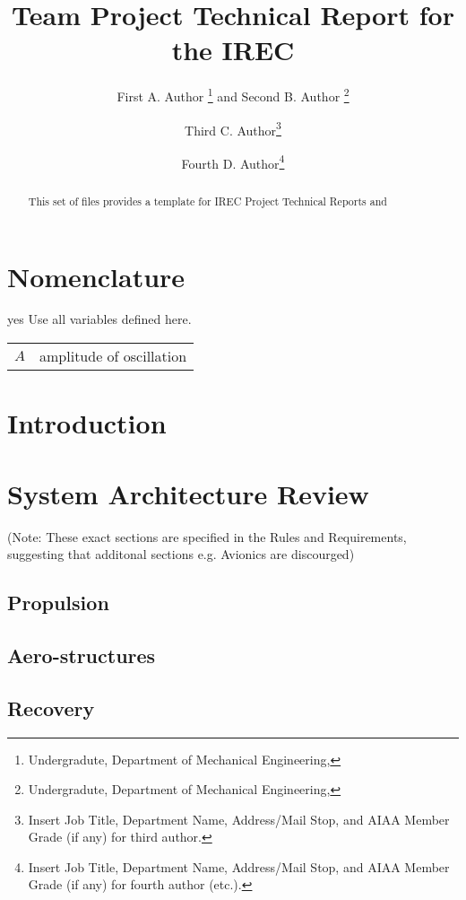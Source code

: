 \documentclass[conf]{new-aiaa}
\title{Team \irecteam{} Project Technical Report for the \irecyear{} IREC}
\author{
	First A. Author
	\footnote{Undergradute, Department of Mechanical Engineering, \RITAddr} and 
	Second B. Author
	\footnote{Undergradute, Department of Mechanical Engineering, \RITAddr}
}
\affil{\RIT, \RITAddr}
\author{Third C. Author\footnote{Insert Job Title, Department Name, Address/Mail Stop, and AIAA Member Grade (if any) for third author.}}
\affil{\RIT, \RITAddr}
\author{Fourth D. Author\footnote{Insert Job Title, Department Name, Address/Mail Stop, and AIAA Member Grade (if any) for fourth author (etc.).}}
\affil{\RIT, \RITAddr}
\def\WIP{yes}
\begin{document}
\maketitle

\begin{abstract}
	This set of files provides a template for IREC Project Technical Reports and 

	\AbstractDescription{}
\end{abstract}

\section{Nomenclature}
\ifdefined\WIP
Use all variables defined here.
\fi

{\renewcommand\arraystretch{1.0}
\noindent\begin{longtable*}{@{}l @{\quad=\quad} l@{}}
	\(A\) & amplitude of oscillation \\
\end{longtable*}}

\pagebreak
\section{Introduction}
\begin{quotation}
\IntroductionDescription
\end{quotation}

\section{System Architecture Review}
\begin{quotation}
\SAODescription
\end{quotation}

(Note: These exact sections are specified in the Rules and Requirements,
suggesting that additonal sections e.g. Avionics are discourged)

\subsection{Propulsion}

\subsection{Aero-structures}

\subsection{Recovery}
\end{document}
